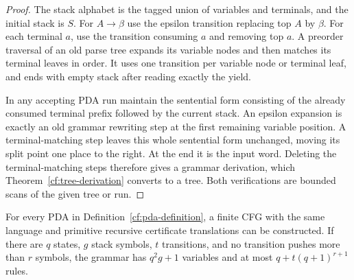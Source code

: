 \begin{proof}
The stack alphabet is the tagged union of variables and terminals, and the
initial stack is $S$.  For $A\to\beta$ use the epsilon transition replacing
top $A$ by $\beta$.  For each terminal $a$, use the transition consuming
$a$ and removing top $a$.  A preorder traversal of an old parse tree expands
its variable nodes and then matches its terminal leaves in order.  It uses
one transition per variable node or terminal leaf, and ends with empty
stack after reading exactly the yield.

In any accepting PDA run maintain the sentential form consisting of the
already consumed terminal prefix followed by the current stack.  An
epsilon expansion is exactly an old grammar rewriting step at the first
remaining variable position.  A terminal-matching step leaves this whole
sentential form unchanged, moving its split point one place to the right.
At the end it is the input word.  Deleting the terminal-matching steps
therefore gives a grammar derivation, which Theorem~\ref{cf:tree-derivation}
converts to a tree.  Both verifications are bounded scans of the given
tree or run.
\end{proof}

\begin{theorem}
\label{cf:pda-to-cfg}
For every PDA in Definition~\ref{cf:pda-definition}, a finite CFG with the
same language and primitive recursive certificate translations can be
constructed.  If there are $q$ states, $g$ stack symbols, $t$ transitions,
and no transition pushes more than $r$ symbols, the grammar has
$q^2g+1$ variables and at most $q+t(q+1)^{r+1}$ rules.
\end{theorem}

